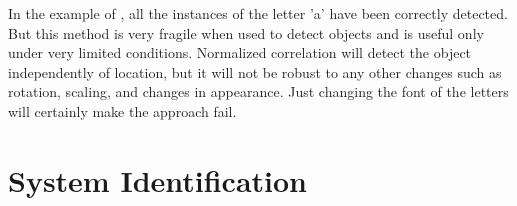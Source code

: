 





In the example of \fig{\ref{fig:normcorr}}, all the instances of the letter 'a' have been correctly detected. But this method is very fragile when used to detect objects and is useful only under very limited conditions. Normalized correlation will detect the object independently of location, but it will not be robust to any other changes such as rotation, scaling, and changes in appearance. Just changing the font of the letters will certainly make the approach fail.

\section{System Identification}

